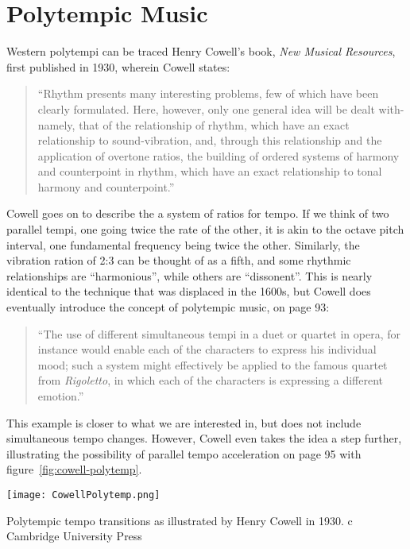 \section{Polytempic Music}
\label{sec:background-polytempi}
Western polytempi can be traced Henry Cowell's book, \textit{New Musical
  Resources}, first published in 1930, wherein Cowell states:
\begin{quotation}
  ``Rhythm presents many interesting problems, few of which have been
  clearly formulated. Here, however, only one general idea will be
  dealt with-namely, that of the relationship of rhythm, which have an
  exact relationship to sound-vibration, and, through this
  relationship and the application of overtone ratios, the building of
  ordered systems of harmony and counterpoint in rhythm, which have an
  exact relationship to tonal harmony and
  counterpoint.''\cite{Cowell1996}
\end{quotation}
Cowell goes on to describe the a system of ratios for tempo. If we
think of two parallel tempi, one going twice the rate of the other, it
is akin to the octave pitch interval, one fundamental frequency being
twice the other. Similarly, the vibration ration of 2:3 can be thought
of as a fifth, and some rhythmic relationships are ``harmonious'',
while others are ``dissonent''. This is nearly identical to the
technique that was displaced in the 1600s, but Cowell does eventually
introduce the concept of polytempic music, on page 93:
\begin{quotation}
``The use of different simultaneous tempi in a duet or quartet in opera,
for instance would enable each of the characters  to express his
individual mood; such a system might  effectively be applied to the
famous quartet from \textit{Rigoletto}, in which each of the
characters is expressing a different emotion.''
\end{quotation}
This example is closer to what we are interested in, but does not
include simultaneous tempo changes. However, Cowell even takes the
idea a step further, illustrating the possibility of parallel tempo
acceleration on page 95 with figure~\ref{fig:cowell-polytemp}.
\begin{marginfigure}
  \texttt{[image: CowellPolytemp.png]}
  \caption{Polytempic tempo transitions as illustrated by Henry Cowell
    in 1930. \textcircled{c} Cambridge University Press}
  \label{fig:cowell-polytemp}
\end{marginfigure}
